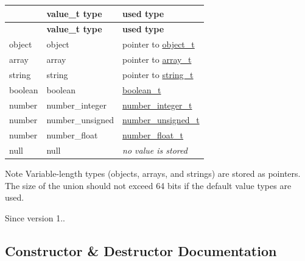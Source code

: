 \tabulinesep=1mm
\begin{longtabu} spread 0pt [c]{*3{|X[-1]}|}
\hline
{}&{\bf value\+\_\+t type }&{\bf used type  }\\
\endfirsthead
\hline
\endfoot
\hline
{}&{\bf value\+\_\+t type }&{\bf used type  }\\
\endhead
object &object &pointer to \hyperlink{classnlohmann_1_1basic__json_a0322396ca5cd4623bc816bf735377623}{object\+\_\+t} \\
array &array &pointer to \hyperlink{classnlohmann_1_1basic__json_a4c409f1b6d9caf3412c78af9a5883fed}{array\+\_\+t} \\
string &string &pointer to \hyperlink{classnlohmann_1_1basic__json_a61f8566a1a85a424c7266fb531dca005}{string\+\_\+t} \\
boolean &boolean &\hyperlink{classnlohmann_1_1basic__json_a4c919102a9b4fe0d588af64801436082}{boolean\+\_\+t} \\
number &number\+\_\+integer &\hyperlink{classnlohmann_1_1basic__json_a98e611d67b7bd75307de99c9358ab2dc}{number\+\_\+integer\+\_\+t} \\
number &number\+\_\+unsigned &\hyperlink{classnlohmann_1_1basic__json_ab906e29b5d83ac162e823ada2156b989}{number\+\_\+unsigned\+\_\+t} \\
number &number\+\_\+float &\hyperlink{classnlohmann_1_1basic__json_a88d6103cb3620410b35200ee8e313d97}{number\+\_\+float\+\_\+t} \\
null &null &{\itshape no value is stored} \\
\end{longtabu}
\begin{DoxyNote}{Note}
Variable-\/length types (objects, arrays, and strings) are stored as pointers. The size of the union should not exceed 64 bits if the default value types are used.
\end{DoxyNote}
\begin{DoxySince}{Since}
version 1.. 
\end{DoxySince}


\subsection{Constructor \& Destructor Documentation}
